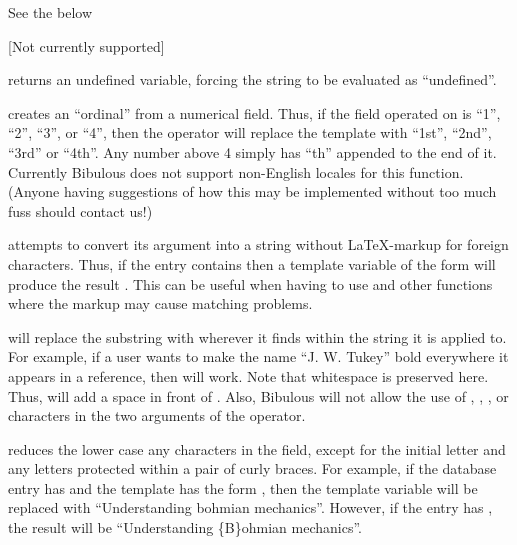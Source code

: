 \documentclass[letterpaper,10pt,english]{sphinxmanual}
\begin{document}
 See the  below

 {[}Not currently supported{]}

 returns an undefined variable, forcing the string to be evaluated as “undefined”.

 creates an “ordinal” from a numerical field. Thus, if the field operated on is “1”, “2”, “3”, or “4”, then the operator will replace the template with “1st”, “2nd”, “3rd” or “4th”. Any number above 4 simply has “th” appended to the end of it. Currently Bibulous does not support non-English locales for this function. (Anyone having suggestions of how this may be implemented without too much fuss should contact us!)

 attempts to convert its argument into a string without LaTeX-markup for foreign characters. Thus, if the entry contains  then a template variable of the form  will produce the result . This can be useful when having to use  and other functions where the markup may cause matching problems.

 will replace the substring  with  wherever it finds  within the string it is applied to. For example, if a user wants to make the name “J. W. Tukey” bold everywhere it appears in a reference, then  will work. Note that whitespace is preserved here. Thus,  will add a space in front of . Also, Bibulous will not allow the use of \sphinxcode{\sphinxupquote{\textless{}}}, \sphinxcode{\sphinxupquote{\textgreater{}}}, \sphinxcode{\sphinxupquote{\textbar{}}}, or \sphinxcode{\sphinxupquote{)}} characters in the two arguments of the operator.

 reduces the lower case any characters in the field, except for the initial letter and any letters protected within a pair of curly braces. For example, if the database entry has  and the template has the form , then the template variable will be replaced with “Understanding bohmian mechanics”. However, if the entry has , the result will be “Understanding \{B\}ohmian mechanics”.
\end{document}
